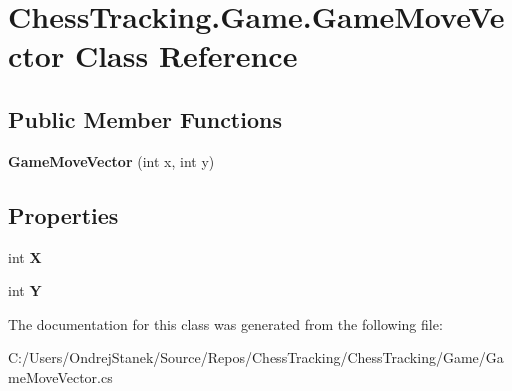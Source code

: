 \hypertarget{class_chess_tracking_1_1_game_1_1_game_move_vector}{}\section{Chess\+Tracking.\+Game.\+Game\+Move\+Vector Class Reference}
\label{class_chess_tracking_1_1_game_1_1_game_move_vector}
\subsection*{Public Member Functions}
\begin{DoxyCompactItemize}
\item 
\mbox{\label{class_chess_tracking_1_1_game_1_1_game_move_vector_a5f8f93efaa9d7e255ba94e8e70cffbd4}} 
{\bfseries Game\+Move\+Vector} (int x, int y)
\end{DoxyCompactItemize}
\subsection*{Properties}
\begin{DoxyCompactItemize}
\item 
\mbox{\label{class_chess_tracking_1_1_game_1_1_game_move_vector_aa9bb177cfc662b22df89c541771a0367}} 
int {\bfseries X}
\item 
\mbox{\label{class_chess_tracking_1_1_game_1_1_game_move_vector_a8c920aa7e86e99a9ccf22c6919efc2a4}} 
int {\bfseries Y}
\end{DoxyCompactItemize}


The documentation for this class was generated from the following file\+:\begin{DoxyCompactItemize}
\item 
C\+:/\+Users/\+Ondrej\+Stanek/\+Source/\+Repos/\+Chess\+Tracking/\+Chess\+Tracking/\+Game/Game\+Move\+Vector.\+cs\end{DoxyCompactItemize}
